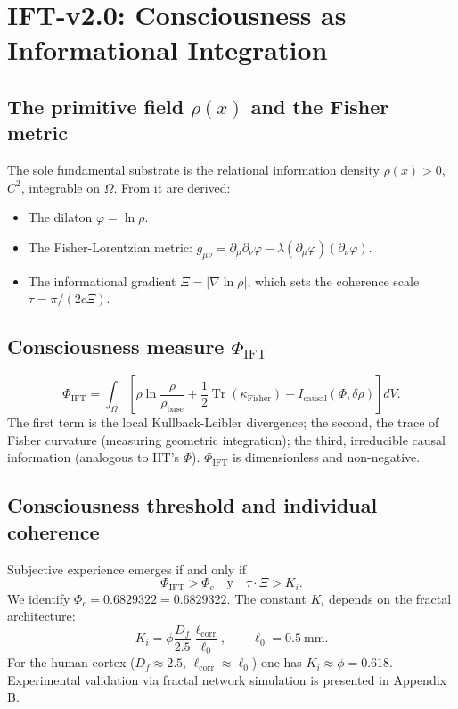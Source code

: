 \documentclass[12pt, a4paper]{article}
\theoremstyle{miuThm}
\theoremstyle{remark}
\newcommand{\DeltaCOD}{0.6829322}
\begin{document}
\section{IFT-v2.0: Consciousness as Informational Integration}
\label{sec:IFT}

\subsection{The primitive field $\rho(x)$ and the Fisher metric}
The sole fundamental substrate is the relational information density $\rho(x) > 0$, $C^2$, integrable on $\Omega$. From it are derived:
\begin{itemize}
\item The dilaton $\varphi = \ln\rho$.
\item The Fisher-Lorentzian metric: $g_{\mu\nu} = \partial_\mu\partial_\nu\varphi - \lambda (\partial_\mu\varphi)(\partial_\nu\varphi)$.
\item The informational gradient $\Xi = |\nabla\ln\rho|$, which sets the coherence scale $\tau = \pi/(2c\Xi)$.
\end{itemize}

\subsection{Consciousness measure $\Phi_{\text{IFT}}$}
\begin{equation}
\Phi_{\text{IFT}} = \int_{\Omega} \left[ \rho\ln\frac{\rho}{\rho_{\text{base}}} + \frac12 \operatorname{Tr}(\kappa_{\text{Fisher}}) + I_{\text{causal}}(\Phi,\delta\rho) \right] dV.
\end{equation}
The first term is the local Kullback-Leibler divergence; the second, the trace of Fisher curvature (measuring geometric integration); the third, irreducible causal information (analogous to IIT's $\Phi$). $\Phi_{\text{IFT}}$ is dimensionless and non-negative.

\subsection{Consciousness threshold and individual coherence}
Subjective experience emerges if and only if
\begin{equation}
\Phi_{\text{IFT}} > \Phi_c \quad \text{y} \quad \tau\cdot\Xi > K_i.
\end{equation}
We identify $\Phi_c = \DeltaCOD = 0.6829322$. The constant $K_i$ depends on the fractal architecture:
\begin{equation}
\boxed{ K_i = \phi \frac{D_f}{2.5} \frac{\ell_{\text{corr}}}{\ell_0}, \qquad \ell_0 = 0.5\ \text{mm} }.
\end{equation}
For the human cortex ($D_f \approx 2.5$, $\ell_{\text{corr}} \approx \ell_0$) one has $K_i \approx \phi = 0.618$. Experimental validation via fractal network simulation is presented in Appendix B.
\end{document}
